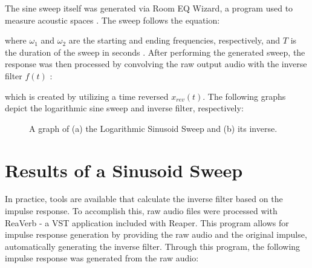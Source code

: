 The sine sweep itself was generated via Room EQ Wizard, a program used to measure acoustic spaces \cite{REW}. The sweep follows the equation:

\begin{center}
\end{center}

where $\omega_1$ and $\omega_2$ are the starting and ending frequencies, respectively, and $T$ is the duration of the sweep in seconds \cite{farina2000simultaneous}. After performing the generated sweep, the response was then processed by convolving the raw output audio with the inverse filter $f(t)$ \cite{inversecalc}:

\begin{center}
\end{center}

which is created by utilizing a time reversed $x_{rev}(t)$. The following graphs depict the logarithmic sine sweep and inverse filter, respectively:


\begin{figure}[h]
\caption{A graph of (a) the Logarithmic Sinusoid Sweep and (b) its inverse.}
\end{figure}

\section{Results of a Sinusoid Sweep}

In practice, tools are available that calculate the inverse filter based on the impulse response. To accomplish this, raw audio files were processed with ReaVerb - a VST application included with Reaper. This program allows for impulse response generation by providing the raw audio and the original impulse, automatically generating the inverse filter. Through this program, the following impulse response was generated from the raw audio:

